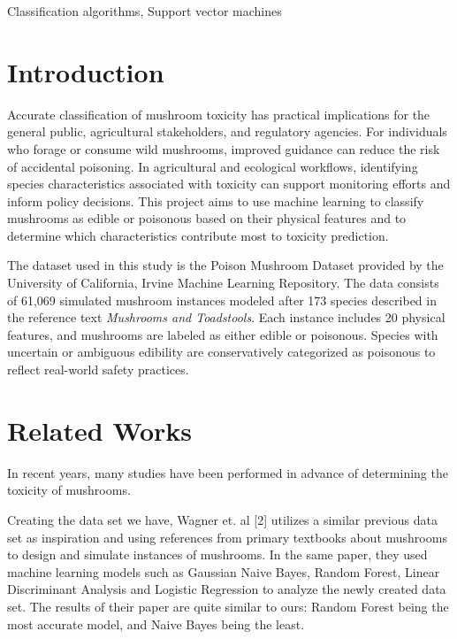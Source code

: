 \documentclass[conference]{IEEEtran}
\begin{document}
\begin{IEEEkeywords}
Classification algorithms, Support vector machines
\end{IEEEkeywords}



\section{Introduction}

Accurate classification of mushroom toxicity has practical implications for the general public, agricultural stakeholders, and regulatory agencies. For individuals who forage or consume wild mushrooms, improved guidance can reduce the risk of accidental poisoning. In agricultural and ecological workflows, identifying species characteristics associated with toxicity can support monitoring efforts and inform policy decisions. This project aims to use machine learning to classify mushrooms as edible or poisonous based on their physical features and to determine which characteristics contribute most to toxicity prediction.

The dataset used in this study is the Poison Mushroom Dataset provided by the University of California, Irvine Machine Learning Repository. The data consists of 61{,}069 simulated mushroom instances modeled after 173 species described in the reference text \emph{Mushrooms and Toadstools}. Each instance includes 20 physical features, and mushrooms are labeled as either edible or poisonous. Species with uncertain or ambiguous edibility are conservatively categorized as poisonous to reflect real-world safety practices.

\section{Related Works}
In recent years, many studies have been performed in advance of determining the toxicity of mushrooms.

Creating the data set we have, Wagner et. al [2] utilizes a similar previous data set as inspiration and using references from primary textbooks about mushrooms to design and simulate instances of mushrooms. In the same paper, they used machine learning models such as Gaussian Naive Bayes, Random Forest, Linear Discriminant Analysis and Logistic Regression to analyze the newly created data set. The results of their paper are quite similar to ours: Random Forest being the most accurate model, and Naive Bayes being the least. 
\end{document}
